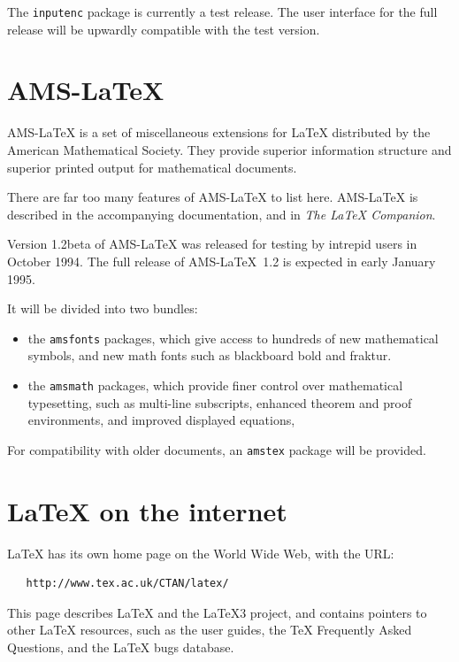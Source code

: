 \documentclass{ltnews}
\providecommand\pkg[1]{\texttt{#1}}
\begin{document}
The \verb|inputenc| package is
currently a test release.  The user interface for the full release will
be upwardly compatible with the test version.

\section{AMS-\LaTeX{}}

 AMS-\LaTeX{} is a set of miscellaneous extensions for \LaTeX{}
 distributed by the American Mathematical Society. They provide superior
 information structure and superior printed output for mathematical
 documents.

 There are far too many features of AMS-\LaTeX{} to list here.
 AMS-\LaTeX{} is described in the accompanying documentation,
 and in \emph{The \LaTeX{} Companion}.

 Version 1.2beta of AMS-\LaTeX{} was released for testing by intrepid
 users in October 1994.  The full release of AMS-\LaTeX{}~1.2 is expected
 in early January 1995.

 It will be divided into two bundles:
 \begin{itemize}

 \item the \pkg{amsfonts} packages, which give access to
    hundreds of new mathematical symbols, and new math fonts
    such as blackboard bold and fraktur.

 \item the \pkg{amsmath} packages, which provide finer control over
    mathematical typesetting, such as multi-line subscripts,
    enhanced theorem and proof environments,
    and improved displayed equations,

 \end{itemize}
 For compatibility with older documents, an \pkg{amstex} package will be
 provided.

\section{\LaTeX{} on the internet}

\LaTeX{} has its own home page on the World Wide Web, with the URL:
\begin{verbatim}
   http://www.tex.ac.uk/CTAN/latex/
\end{verbatim}
This page describes \LaTeX{} and the \LaTeX3 project, and contains
pointers to other \LaTeX{} resources, such as the user guides, the
\TeX{} Frequently Asked Questions, and the \LaTeX{} bugs database.
\end{document}
